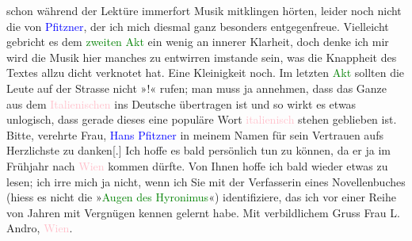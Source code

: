                     schon während der Lektüre immerfort Musik mitklingen hörten, leider noch nicht
                    die von \textcolor{blue}{Pfitzner}{}\ledrightnote{\textcolor{blue}{Hans Pfitzner}}, der ich mich diesmal ganz
                    besonders entgegenfreue. Vielleicht gebricht es dem \textcolor{green}{zweiten Akt}{} ein wenig an innerer Klarheit, doch denke
                    ich mir wird die Musik hier manches zu entwirren imstande sein, was die
                    Knappheit des Textes allzu dicht verknotet hat. Eine Kleinigkeit noch. Im
                    letzten \textcolor{green}{Akt}{} sollten die
                    Leute auf der Strasse nicht »\label{K_L02574-1v}\label{K_L02574-1h}!« rufen; man muss ja annehmen, dass das Ganze aus dem \textcolor{pink}{Italienischen}{}\ledrightnote{\textcolor{pink}{Italien}} ins Deutsche über{\pb}tragen ist und so wirkt es etwas unlogisch, dass gerade
                    dieses eine populäre Wort \textcolor{pink}{italienisch}{}\ledrightnote{\textcolor{pink}{Italien}} stehen
                    geblieben ist.\pend
           \pstart
           Bitte, verehrte Frau, \textcolor{blue}{Hans Pfitzner}{}\ledrightnote{\textcolor{blue}{Hans Pfitzner}} in meinem
                    Namen für sein Vertrauen aufs Herzlichste zu danken{[}.{]} Ich
                    hoffe es bald persönlich tun zu können, da er ja im Frühjahr nach \textcolor{pink}{Wien}{}\ledrightnote{\textcolor{pink}{Wien}} kommen dürfte. Von Ihnen hoffe ich bald
                    wieder etwas zu lesen; ich irre mich ja nicht, wenn ich Sie mit der Verfasserin
                    eines Novellenbuches (hiess es nicht die »\textcolor{green}{Augen des
                            Hyronimus}{}\ledrightnote{\textcolor{green}{Die Augen des Hieronymus}}«) identifiziere, das ich vor
                    einer Reihe von Jahren mit Vergnügen kennen gelernt habe.\pend
           \pstart Mit verbildlichem Gruss\pend{}{\bigskip}\pstart
           \noindent{}Frau L. Andro, \textcolor{pink}{Wien}{}\ledrightnote{\textcolor{pink}{Wien}}.\pend
           \endnumbering{}  
      